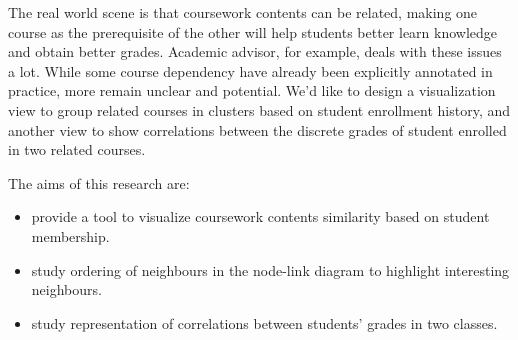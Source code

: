 
The real world scene is that coursework contents can be related, making one course as the prerequisite of the other will help students better learn knowledge and obtain better grades. Academic advisor, for example, deals with these issues a lot.
While some course dependency have already been explicitly annotated in practice, more remain unclear and potential. We'd like to design a visualization view to group related courses in clusters based on student enrollment history, and another view to show correlations between the discrete grades of student enrolled in two related courses.

The aims of this research are:
\begin{itemize}
  \item provide a tool to visualize coursework contents similarity based on student membership.
  \item study ordering of neighbours in the node-link diagram to highlight interesting neighbours. 
  \item study representation of correlations between students' grades in two classes.
\end{itemize}

